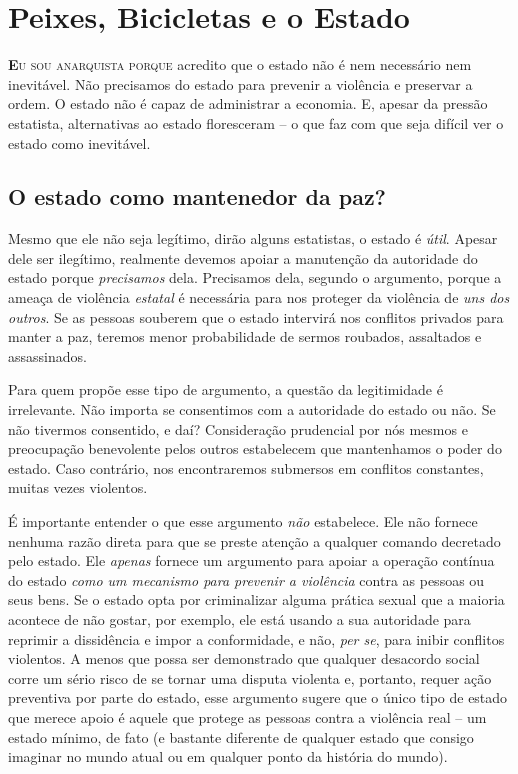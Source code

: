 
\chapter{Peixes, Bicicletas e o Estado}
\label{chap:2}

\lettrine[lines=2]{\textcolor{LettrineColor}{\textbf{E}}}{u sou anarquista porque} acredito que o estado não é nem necessário nem inevitável. Não precisamos do estado para prevenir a violência e preservar a ordem. O estado não é capaz de administrar a economia. E, apesar da pressão estatista, alternativas ao estado floresceram -- o que faz com que seja difícil ver o estado como inevitável.

\section{O estado como mantenedor da paz?}

Mesmo que ele não seja legítimo, dirão alguns estatistas, o estado é \emph{útil}. Apesar dele ser ilegítimo, realmente devemos apoiar a manutenção da autoridade do estado porque \emph{precisamos} dela. Precisamos dela, segundo o argumento, porque a ameaça de violência \emph{estatal} é necessária para nos proteger da violência de \emph{uns dos outros}. Se as pessoas souberem que o estado intervirá nos conflitos privados para manter a paz, teremos menor probabilidade de sermos roubados, assaltados e assassinados.

Para quem propõe esse tipo de argumento, a questão da legitimidade é irrelevante. Não importa se consentimos com a autoridade do estado ou não. Se não tivermos consentido, e daí? Consideração prudencial por nós mesmos e preocupação benevolente pelos outros estabelecem que mantenhamos o poder do estado. Caso contrário, nos encontraremos submersos em conflitos constantes, muitas vezes violentos.

É importante entender o que esse argumento \emph{não} estabelece. Ele não fornece nenhuma razão direta para que se preste atenção a qualquer comando decretado pelo estado. Ele \emph{apenas} fornece um argumento para apoiar a operação contínua do estado \emph{como um mecanismo para prevenir a violência} contra as pessoas ou seus bens. Se o estado opta por criminalizar alguma prática sexual que a maioria acontece de não gostar, por exemplo, ele está usando a sua autoridade para reprimir a dissidência e impor a conformidade, e não, \emph{per se}, para inibir conflitos violentos. A menos que possa ser demonstrado que qualquer desacordo social corre um sério risco de se tornar uma disputa violenta e, portanto, requer ação preventiva por parte do estado, esse argumento sugere que o único tipo de estado que merece apoio é aquele que protege as pessoas contra a violência real -- um estado mínimo, de fato (e bastante diferente de qualquer estado que consigo imaginar no mundo atual ou em qualquer ponto da história do mundo).

